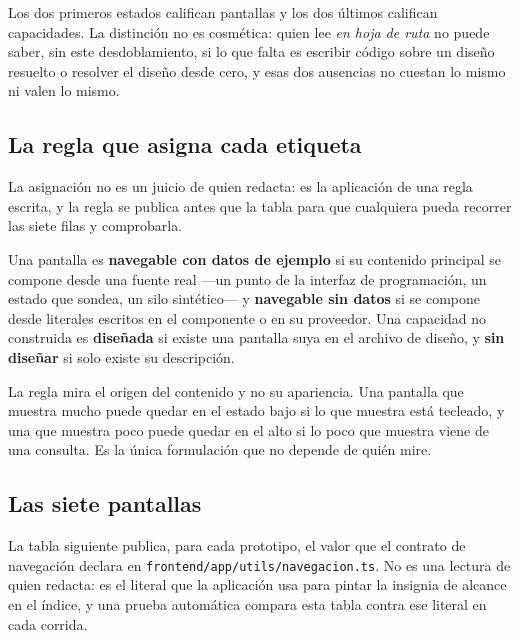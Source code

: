 Los dos primeros estados califican pantallas y los dos últimos califican capacidades. La distinción
no es cosmética: quien lee \emph{en hoja de ruta} no puede saber, sin este desdoblamiento, si lo
que falta es escribir código sobre un diseño resuelto o resolver el diseño desde cero, y esas dos
ausencias no cuestan lo mismo ni valen lo mismo.

\subsection{La regla que asigna cada etiqueta}

La asignación no es un juicio de quien redacta: es la aplicación de una regla escrita, y la regla se
publica antes que la tabla para que cualquiera pueda recorrer las siete filas y comprobarla.

\begin{uxdestacado}
Una pantalla es \textbf{navegable con datos de ejemplo} si su contenido principal se compone desde
una fuente real ---un punto de la interfaz de programación, un estado que sondea, un silo
sintético--- y \textbf{navegable sin datos} si se compone desde literales escritos en el componente
o en su proveedor. Una capacidad no construida es \textbf{diseñada} si existe una pantalla suya en
el archivo de diseño, y \textbf{sin diseñar} si solo existe su descripción.
\end{uxdestacado}

La regla mira el origen del contenido y no su apariencia. Una pantalla que muestra mucho puede
quedar en el estado bajo si lo que muestra está tecleado, y una que muestra poco puede quedar en el
alto si lo poco que muestra viene de una consulta. Es la única formulación que no depende de quién
mire.

\subsection{Las siete pantallas}

La tabla siguiente publica, para cada prototipo, el valor que el contrato de navegación declara en
\texttt{frontend/app/utils/navegacion.ts}. No es una lectura de quien redacta: es el literal que la
aplicación usa para pintar la insignia de alcance en el índice, y una prueba automática compara
esta tabla contra ese literal en cada corrida.

